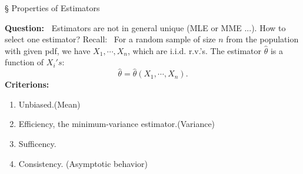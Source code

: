 \begin{frame}{\S{} Properties of Estimators}

 {\bf Question:~} Estimators are not in general unique (MLE or MME ...). How to select one estimator?
 \vfill
 {Recall:~} For a random sample of size $n$ from the population with given pdf, we have $X_1,\cdots,X_n$, which are i.i.d. r.v.'s. The estimator $\hat{\theta}$ is a function of $X_i's$:
 \[
 \hat{\theta}=\hat{\theta}(X_1,\cdots,X_n).
 \]
 \vfill
 {\bf Criterions:}
 \begin{enumerate}
   \item Unbiased.\hfill (Mean)
  \item Efficiency, the minimum-variance estimator.\hfill (Variance)
  \item Sufficency.
  \item Consistency. \hfill (Asymptotic behavior)
 \end{enumerate}

 \end{frame}

